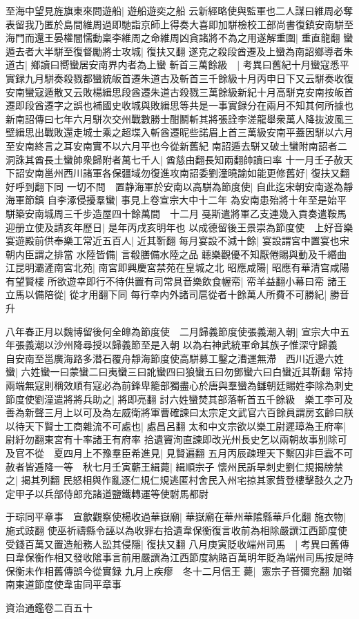 至海中望見旌旗東來問遊船|{
	遊船遊奕之船}
云新經略使與監軍也二人謀曰維周必奪表留我乃匿於島間維周過即馳詣京師上得奏大喜即加駢檢校工部尚書復鎮安南駢至海門而還王晏權闇懦動稟李維周之命維周凶貪諸將不為之用遂解重圍|{
	重直龍翻}
蠻遁去者大半駢至復督勵將士攻城|{
	復扶又翻}
遂克之殺段酋遷及上蠻為南詔鄉導者朱道古|{
	鄉讀曰嚮蠻居安南界内者為上蠻}
斬首三萬餘級　|{
	考異曰舊紀十月蠻寇悉平實録九月駢奏殺戮都蠻統皈首遷朱道古及斬首三千餘級十月丙申日下又云駢奏收復安南蠻寇遁散又云敗楊緝思段酋遷朱道古殺戮三萬餘級新紀十月高駢克安南按皈首遷即段酋遷字之誤也補國史收城與敗緝思等共是一事實録分在兩月不知其何所據也新南詔傳曰七年六月駢次交州戰數勝士酣鬭斬其將張詮李溠龍舉衆萬人降抜波風三壁緝思出戰敗還走城士乘之超堞入斬酋遷昵些諾眉上首三萬級安南平蓋因駢以六月至安南終言之耳安南實不以六月平也今從新舊紀}
南詔遁去駢又破土蠻附南詔者二洞誅其酋長土蠻帥衆歸附者萬七千人|{
	酋慈由翻長知兩翻帥讀曰率}
十一月壬子赦天下詔安南邕州西川諸軍各保疆域勿復進攻南詔委劉潼曉諭如能更修舊好|{
	復扶又翻好呼到翻下同}
一切不問　置静海軍於安南以高駢為節度使|{
	自此迄宋朝安南遂為靜海軍節鎮}
自李涿侵擾羣蠻|{
	事見上卷宣宗大中十二年}
為安南患殆將十年至是始平駢築安南城周三千步造屋四十餘萬間　十二月戞斯遣將軍乙支連幾入貢奏遣鞍馬迎册立使及請亥年歷日|{
	是年丙戌亥明年也}
以成德留後王景崇為節度使　上好音樂宴遊殿前供奉樂工常近五百人|{
	近其靳翻}
每月宴設不減十餘|{
	宴設謂宮中置宴也宋朝内臣謂之排當}
水陸皆備|{
	言殽膳備水陸之品}
聼樂觀優不知厭倦賜與動及千緡曲江昆明灞滻南宮北苑|{
	南宮即興慶宮禁苑在皇城之北}
昭應咸陽|{
	昭應有華清宫咸陽有望賢樓}
所欲遊幸即行不待供置有司常具音樂飲食幄帟|{
	帟羊益翻小幕曰帟}
諸王立馬以備陪從|{
	從才用翻下同}
每行幸内外諸司扈從者十餘萬人所費不可勝紀|{
	勝音升}


八年春正月以魏博留後何全皥為節度使　二月歸義節度使張義潮入朝|{
	宣宗大中五年張義潮以沙州降尋授以歸義節至是入朝}
以為右神武統軍命其族子惟深守歸義　自安南至邕廣海路多潜石覆舟靜海節度使高駢募工鑿之漕運無滯　西川近邊六姓蠻|{
	六姓蠻一曰蒙蠻二曰夷蠻三曰訛蠻四曰狼蠻五曰勿鄧蠻六曰白蠻近其靳翻}
常持兩端無寇則稱效順有寇必為前鋒卑籠部獨盡心於唐與羣蠻為讎朝廷賜姓李除為刺史節度使劉潼遣將將兵助之|{
	將即亮翻}
討六姓蠻焚其部落斬首五千餘級　樂工李可及善為新聲三月上以可及為左威衛將軍曹確諫曰太宗定文武官六百餘員謂房玄齡曰朕以待天下賢士工商雜流不可處也|{
	處昌呂翻}
太和中文宗欲以樂工尉遲璋為王府率|{
	尉紆勿翻東宮有十率諸王有府率}
拾遺竇洵直諫即改光州長史乞以兩朝故事别除可及官不從　夏四月上不豫羣臣希進見|{
	見賢遍翻}
五月丙辰疎理天下繫囚非巨蠧不可赦者皆逓降一等　秋七月壬寅蘄王緝薨|{
	緝順宗子}
懷州民訴旱刺史劉仁規揭牓禁之|{
	揭其列翻}
民怒相與作亂逐仁規仁規逃匿村舍民入州宅掠其家貲登樓擊鼓久之乃定甲子以兵部侍郎充諸道鹽鐵轉運等使駙馬都尉

于琮同平章事　宣歙觀察使楊收過華嶽廟|{
	華嶽廟在華州華隂縣華戶化翻}
施衣物|{
	施式豉翻}
使巫祈禱縣令誣以為收罪右拾遺韋保衡復言收前為相除嚴譔江西節度使受錢百萬又置造船務人訟其侵隱|{
	復扶又翻}
八月庚寅貶收端州司馬　|{
	考異曰舊傳曰韋保衡作相又發收隂事言前用嚴譔為江西節度納賂百萬明年貶為端州司馬按是時保衡未作相舊傳誤今從實録}
九月上疾瘳　冬十二月信王薨|{
	憲宗子音彌兖翻}
加嶺南東道節度使韋宙同平章事

資治通鑑卷二百五十
